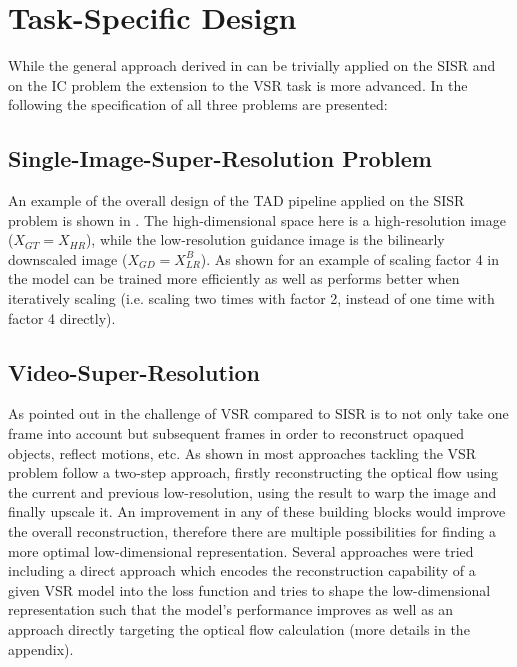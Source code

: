 \section{Task-Specific Design}
\label{sec:Approach_TSD}
While the general approach derived in  can be trivially applied on the \ac{SISR} and on the \ac{IC} problem the extension to the \ac{VSR} task is more advanced. In the following the specification of all three problems are presented:

\subsection*{Single-Image-Super-Resolution Problem}
An example of the overall design of the \ac{TAD} pipeline applied on the
\ac{SISR} problem is shown in . The high-dimensional space here is a high-resolution image ($X_{GT} = X_{HR}$), while the low-resolution guidance image is the bilinearly downscaled image ($X_{GD} = X_{LR}^{B}$). As shown for an example of scaling factor 4 in  the model can be trained more efficiently as well as performs better when iteratively scaling (i.e. scaling two times with factor 2, instead of one time with factor 4 directly).

\subsection*{Video-Super-Resolution}
As pointed out in  the challenge of \ac{VSR} compared to \ac{SISR} is to not only take one frame into account but subsequent frames in order to reconstruct opaqued objects, reflect motions, etc. As shown in  most approaches tackling the \ac{VSR} problem follow a two-step approach, firstly reconstructing the optical flow using the current and previous low-resolution, using the result to warp the image and finally upscale it. An improvement in any of these building blocks would improve the overall reconstruction, therefore there are multiple possibilities for finding a more optimal low-dimensional representation. Several approaches were tried including a direct approach which encodes the reconstruction capability of a given \ac{VSR} model into the loss function and tries to shape the low-dimensional representation such that the model's performance improves as well as an approach directly targeting the optical flow calculation (more details in the appendix).

